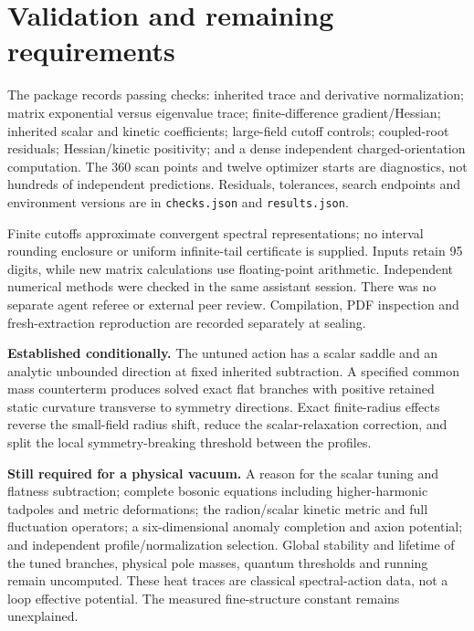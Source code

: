 \documentclass[11pt,letterpaper]{article}
\begin{document}
\section{Validation and remaining requirements}

The package records \CheckCount{} passing checks: inherited trace and derivative normalization; matrix exponential versus eigenvalue trace; finite-difference gradient/Hessian; inherited scalar and kinetic coefficients; large-field cutoff controls; coupled-root residuals; Hessian/kinetic positivity; and a dense independent charged-orientation computation. The 360 scan points and twelve optimizer starts are diagnostics, not hundreds of independent predictions. Residuals, tolerances, search endpoints and environment versions are in \texttt{checks.json} and \texttt{results.json}.

Finite cutoffs approximate convergent spectral representations; no interval rounding enclosure or uniform infinite-tail certificate is supplied. Inputs retain 95 digits, while new matrix calculations use floating-point arithmetic. Independent numerical methods were checked in the same assistant session. There was no separate agent referee or external peer review. Compilation, PDF inspection and fresh-extraction reproduction are recorded separately at sealing.

\textbf{Established conditionally.} The untuned action has a scalar saddle and an analytic unbounded direction at fixed inherited subtraction. A specified common mass counterterm produces solved exact flat branches with positive retained static curvature transverse to symmetry directions. Exact finite-radius effects reverse the small-field radius shift, reduce the scalar-relaxation correction, and split the local symmetry-breaking threshold between the profiles.

\begin{samepage}
\textbf{Still required for a physical vacuum.} A reason for the scalar tuning and flatness subtraction; complete bosonic equations including higher-harmonic tadpoles and metric deformations; the radion/scalar kinetic metric and full fluctuation operators; a six-dimensional anomaly completion and axion potential; and independent profile/normalization selection. Global stability and lifetime of the tuned branches, physical pole masses, quantum thresholds and running remain uncomputed. These heat traces are classical spectral-action data, not a loop effective potential. The measured fine-structure constant remains unexplained.
\end{samepage}
\end{document}
